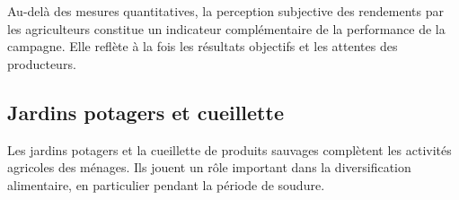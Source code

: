 \documentclass[
  french,
  letterpaper,
]{report}
\begin{document}
Au-delà des mesures quantitatives, la perception subjective des
rendements par les agriculteurs constitue un indicateur complémentaire
de la performance de la campagne. Elle reflète à la fois les résultats
objectifs et les attentes des producteurs.

\begin{table}

\caption{\label{tbl-rendement-autres}Perception des rendements des
cultures non rizicoles}


\end{table}%

\subsection{Jardins potagers et cueillette}\label{sec-jardins}

Les jardins potagers et la cueillette de produits sauvages complètent
les activités agricoles des ménages. Ils jouent un rôle important dans
la diversification alimentaire, en particulier pendant la période de
soudure.
\end{document}
